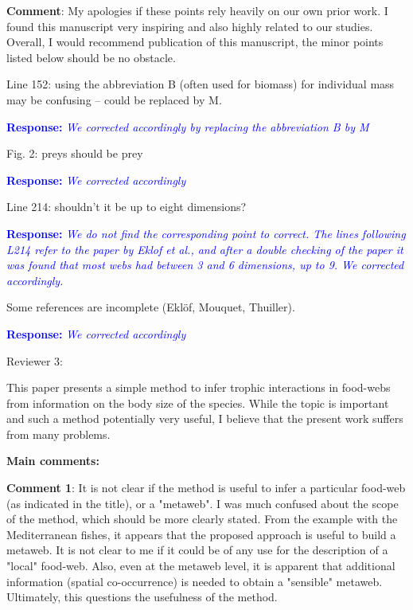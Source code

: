 \documentclass [12pt,onecolumn,twoside,openright]{report}
\begin{document}
\begin{onehalfspacing}
\medskip \textbf{Comment}: My apologies if these points rely
heavily on our own prior work. I found this manuscript very inspiring and also
highly related to our studies. Overall, I would recommend publication of this
manuscript, the minor points listed below should be no obstacle.

\medskip Line 152: using the abbreviation B (often used for
biomass) for individual mass may be confusing – could be replaced by M.

\textcolor{blue}{\textbf{Response:}} \textit{\textcolor{blue}{We corrected
accordingly by replacing the abbreviation B by M}}

\medskip Fig. 2: preys should be prey

\textcolor{blue}{\textbf{Response:}} \textit{\textcolor{blue}{We corrected
accordingly}}

\medskip Line 214: shouldn't it be up to eight dimensions?

\textcolor{blue}{\textbf{Response:}} \textit{\textcolor{blue}{We do not find the corresponding point to correct. The lines following L214 refer to the paper by Eklof et al., and after a double checking of the paper it was found that most webs had between 3 and 6 dimensions, up to 9. We corrected accordingly.}}

\medskip Some references are incomplete (Eklöf, Mouquet,
Thuiller). 

\textcolor{blue}{\textbf{Response:}} \textit{\textcolor{blue}{We corrected
accordingly}}


\newpage
\begin{center} {\large Reviewer 3:} \end{center}

This paper presents a simple method to infer trophic interactions in food-webs
from information on the body size of the species. While the topic is important
and such a method potentially very useful, I believe that the present work
suffers from many problems.

\medskip 
\medskip \textbf{\large{Main comments:}}

\medskip \textbf{Comment 1}: It is not clear if the method is
useful to infer a particular food-web (as indicated in the title), or a
"metaweb". I was much confused about the scope of the method, which should be
more clearly stated. From the example with the Mediterranean fishes, it appears
that the proposed approach is useful to build a metaweb. It is not clear to me
if it could be of any use for the description of a "local" food-web. Also, even
at the metaweb level, it is apparent that additional information (spatial
co-occurrence) is needed to obtain a "sensible" metaweb. Ultimately, this
questions the usefulness of the method.


\end{onehalfspacing}
\end{document}
